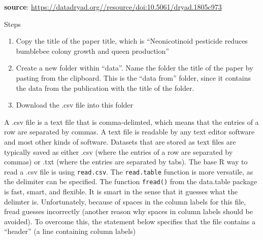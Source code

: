 \documentclass[]{book}
\newenvironment{Shaded}{\begin{snugshade}}{\end{snugshade}}
\newcommand{\DataTypeTok}[1]{\textcolor[rgb]{0.13,0.29,0.53}{#1}}
\newcommand{\KeywordTok}[1]{\textcolor[rgb]{0.13,0.29,0.53}{\textbf{#1}}}
\newcommand{\NormalTok}[1]{#1}
\newcommand{\OperatorTok}[1]{\textcolor[rgb]{0.81,0.36,0.00}{\textbf{#1}}}
\newcommand{\OtherTok}[1]{\textcolor[rgb]{0.56,0.35,0.01}{#1}}
\newcommand{\StringTok}[1]{\textcolor[rgb]{0.31,0.60,0.02}{#1}}
\providecommand{\tightlist}{%
  \setlength{\itemsep}{0pt}\setlength{\parskip}{0pt}}
\begin{document}
\textbf{source}: \url{https://datadryad.org//resource/doi:10.5061/dryad.1805c973}

Steps

\begin{enumerate}
\def\labelenumi{\arabic{enumi}.}
\tightlist
\item
  Copy the title of the paper title, which is ``Neonicotinoid pesticide reduces bumblebee colony growth and queen production''
\item
  Create a new folder within ``data''. Name the folder the title of the paper by pasting from the clipboard. This is the ``data from'' folder, since it contains the data from the publication with the title of the folder.
\item
  Download the .csv file into this folder
\end{enumerate}

A .csv file is a text file that is comma-delimted, which means that the entries of a row are separated by commas. A text file is readable by any text editor software and most other kinds of software. Datasets that are stored as text files are typically saved as either .csv (where the entries of a row are separated by commas) or .txt (where the entries are separated by tabs). The base R way to read a .csv file is using \texttt{read.csv}. The \texttt{read.table} function is more versatile, as the delimiter can be specified. The function \texttt{fread()} from the data.table package is fast, smart, and flexible. It is smart in the sense that it guesses what the delimter is. Unfortunately, because of spaces in the column labels for this file, fread guesses incorrectly (another reason why spaces in column labels should be avoided). To overcome this, the statement below specifies that the file contains a ``header'' (a line containing column labels)

\begin{Shaded}
\end{Shaded}
\end{document}

